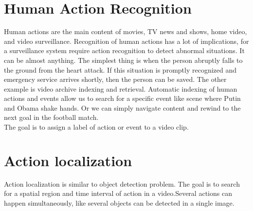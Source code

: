 \documentclass{report}
\begin{document}
\chapter {Human Action Recognition}
Human actions are the main content of movies, TV news and shows, home video, and video surveillance. Recognition of human actions has
a lot of implications, for a surveillance system require action recognition to detect abnormal situations. It can be almost anything.
The simplest thing is when the person abruptly falls to the ground from the heart attack. 
If this situation is promptly recognized and emergency service arrives shortly, then the person can be saved. 
The other example is video archive indexing and retrieval. Automatic indexing of human actions and events allow us to search for
a specific event like scene where Putin and Obama shake hands. Or we can simply navigate content and rewind to the next goal in
the football match. \\
The goal is to assign a label of action or event to a video clip. 

\chapter{Action localization}
Action localization is similar to object detection problem. The goal is to search for a spatial region and time interval of action in a video.Several actions can happen simultaneously, like several objects can be detected in a single image.
\end{document}
